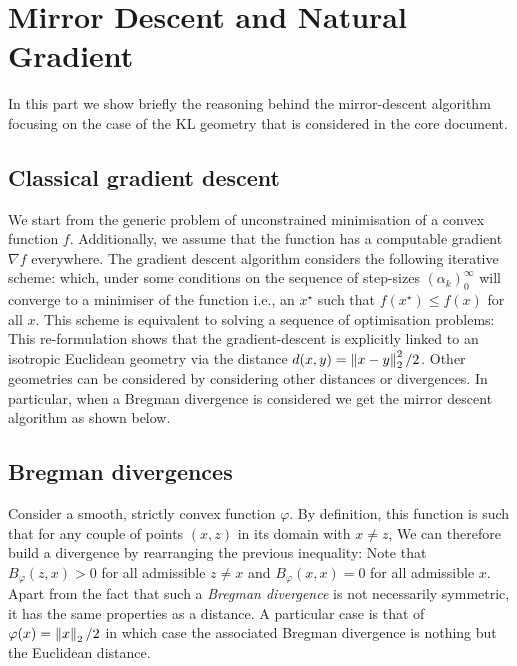 
\section{\label{app:MDA+NG}Mirror Descent and Natural Gradient}

In this part we show briefly the reasoning behind the mirror-descent algorithm focusing on the case of the KL geometry that is considered in the core document.

\subsection{Classical gradient descent}
We start from the generic problem of unconstrained minimisation of a convex function $f$. Additionally, we assume that the function has a computable gradient $\nabla f$ everywhere. The gradient descent algorithm considers the following iterative scheme:
which, under some conditions on the sequence of step-sizes $(\alpha_{k})_{0}^{\infty}$ will converge to a minimiser of the function i.e., an $x^{\star}$ such that $f(x^{\star})\le f(x)$ for all $x$. This scheme is equivalent to solving a sequence of optimisation problems:
This re-formulation shows that the gradient-descent is explicitly linked to an isotropic Euclidean geometry via the distance $d(x,y)=\left\|x-y\right\|_{2}^{2}/2$. Other geometries can be considered by considering other distances or divergences. In particular, when a Bregman divergence is considered we get the mirror descent algorithm as shown below.

\subsection{Bregman divergences}
Consider a smooth, strictly convex function $\varphi$. By definition, this function is such that for any couple of points $(x,z)$ in its domain with $x\neq z$, 
We can therefore build a divergence by rearranging the previous inequality:
Note that $B_{\varphi}(z,x)>0$ for all admissible $z\neq x$ and $B_{\varphi}(x,x)=0$ for all admissible $x$. Apart from the fact that such a \emph{Bregman divergence} is not necessarily symmetric, it has the same properties as a distance. A particular case is that of $\varphi(x)=\left\|x\right\|_{2}/2$ in which case the associated Bregman divergence is nothing but the Euclidean distance.

